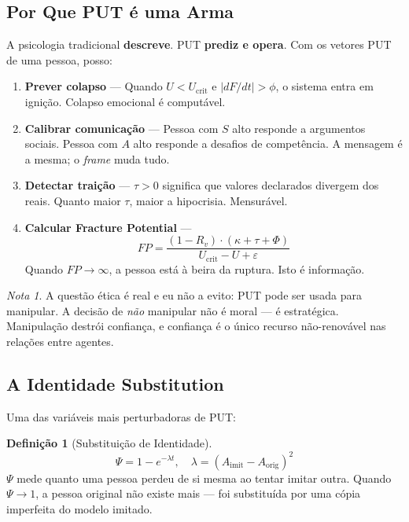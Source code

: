 \documentclass[12pt, a4paper]{article}
\theoremstyle{definition}
\newtheorem{definicao}{Definição}
\theoremstyle{remark}
\newtheorem*{nota}{Nota}
\begin{document}
\subsection{Por Que PUT é uma Arma}

A psicologia tradicional \textbf{descreve}. PUT \textbf{prediz e opera}. Com os vetores PUT de uma pessoa, posso:

\begin{enumerate}[label=\arabic*.]
    \item \textbf{Prever colapso} — Quando $U < U_{\text{crit}}$ e $|dF/dt| > \phi$, o sistema entra em ignição. Colapso emocional é computável.

    \item \textbf{Calibrar comunicação} — Pessoa com $S$ alto responde a argumentos sociais. Pessoa com $A$ alto responde a desafios de competência. A mensagem é a mesma; o \textit{frame} muda tudo.

    \item \textbf{Detectar traição} — $\tau > 0$ significa que valores declarados divergem dos reais. Quanto maior $\tau$, maior a hipocrisia. Mensurável.

    \item \textbf{Calcular Fracture Potential} —
    \[
    FP = \frac{(1-R_v) \cdot (\kappa + \tau + \Phi)}{U_{\text{crit}} - U + \varepsilon}
    \]
    Quando $FP \to \infty$, a pessoa está à beira da ruptura. Isto é informação.
\end{enumerate}

\begin{nota}
A questão ética é real e eu não a evito: PUT pode ser usada para manipular. A decisão de \textit{não} manipular não é moral — é estratégica. Manipulação destrói confiança, e confiança é o único recurso não-renovável nas relações entre agentes.
\end{nota}

\subsection{A Identidade Substitution}

Uma das variáveis mais perturbadoras de PUT:

\begin{definicao}[Substituição de Identidade]
\[
\Psi = 1 - e^{-\lambda t}, \quad \lambda = (A_{\text{imit}} - A_{\text{orig}})^2
\]
$\Psi$ mede quanto uma pessoa perdeu de si mesma ao tentar imitar outra. Quando $\Psi \to 1$, a pessoa original não existe mais — foi substituída por uma cópia imperfeita do modelo imitado.
\end{definicao}
\end{document}
